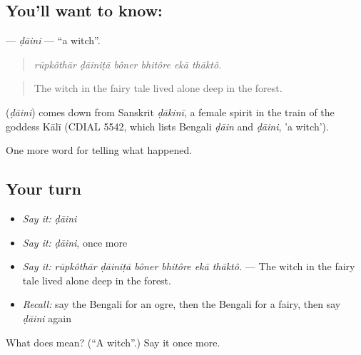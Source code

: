\subsection*{You'll want to know: }
\textbf{} — \emph{ḍāini} — \textquotedblleft{}a witch\textquotedblright{}.

\begin{quote}
     
\end{quote}

\begin{quote}
\emph{rūpkôthār ḍāiniṭā bôner bhitôre ekā thāktô.}
\end{quote}

\begin{quote}
The witch in the fairy tale lived alone deep in the forest.
\end{quote}

\begin{cousinweb}
\textbf{} (\emph{ḍāini}) comes down from Sanskrit \emph{ḍākinī}, a female spirit in the train of the goddess Kālī (CDIAL 5542, which lists Bengali \emph{ḍāin} and \emph{ḍāini}, 'a witch').
\end{cousinweb}

\begin{grammarlens}[title={What you've built}]
One more word for telling what happened.
\end{grammarlens}

\subsection*{Your turn}
\begin{itemize}
\raggedright
  \item \emph{Say it:} \emph{ḍāini}
  \item \emph{Say it:} \emph{ḍāini}, once more
  \item \emph{Say it:} \emph{rūpkôthār ḍāiniṭā bôner bhitôre ekā thāktô.} — The witch in the fairy tale lived alone deep in the forest.
  \item \emph{Recall:} say the Bengali for an ogre, then the Bengali for a fairy, then say \emph{ḍāini} again
\end{itemize}

\begin{tcolorbox}[breakable,colback=teal!4,colframe=teal!35!black,title={Before you move on}]
What does  mean? (\textquotedblleft{}A witch\textquotedblright{}.) Say it once more.
\end{tcolorbox}
